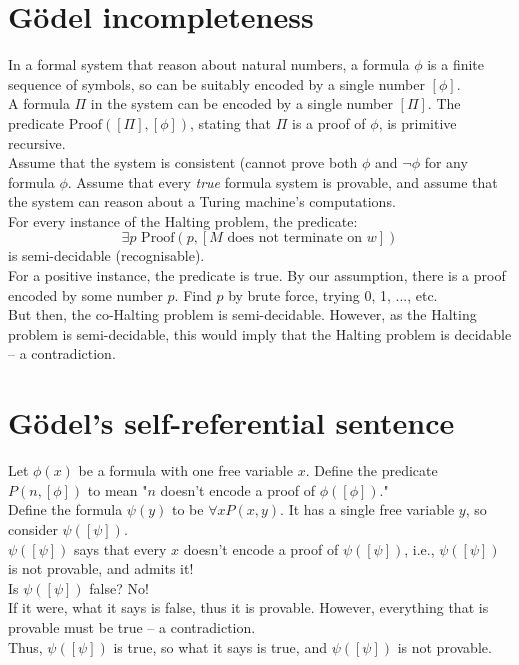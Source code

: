 \documentclass{article}
\begin{document}
\section{Gödel incompleteness}
In a formal system that reason about natural numbers, a formula $\phi$ is a finite sequence of symbols, so can be suitably encoded by a single number $[\phi]$.\bigskip
\\ A formula $\Pi$ in the system can be encoded by a single number $[\Pi]$. The predicate $\text{Proof}([\Pi], [\phi])$, stating that $\Pi$ is a proof of $\phi$, is primitive recursive.\bigskip
\\ Assume that the system is consistent (cannot prove both $\phi$ and $\neg\phi$ for any formula $\phi$. Assume that every \textit{true} formula system is provable, and assume that the system can reason about a Turing machine's computations.
\\ For every instance of the Halting problem, the predicate:
$$\exists p \text{ Proof}(p, [M \text{ does not terminate on } w])$$
is semi-decidable (recognisable).\smallskip
\\ For a positive instance, the predicate is true. By our assumption, there is a proof encoded by some number $p$. Find $p$ by brute force, trying 0, 1, ..., etc.\smallskip
\\ But then, the co-Halting problem is semi-decidable. However, as the Halting problem is semi-decidable, this would imply that the Halting problem is decidable -- a contradiction.

\section{Gödel's self-referential sentence}
Let $\phi(x)$ be a formula with one free variable $x$. Define the predicate $P(n, [\phi])$ to mean "$n$ doesn't encode a proof of $\phi([\phi])$."\medskip
\\ Define the formula $\psi(y)$ to be $\forall x P(x, y)$. It has a single free variable $y$, so consider $\psi([\psi])$.
\\ $\psi([\psi])$ says that every $x$ doesn't encode a proof of $\psi([\psi])$, i.e., $\psi([\psi])$ is not provable, and admits it!\medskip
\\ Is $\psi([\psi])$ false? No!
\\ If it were, what it says is false, thus it is provable. However, everything that is provable must be true -- a contradiction.
\\ Thus, $\psi([\psi])$ is true, so what it says is true, and $\psi([\psi])$ is not provable.
\end{document}
